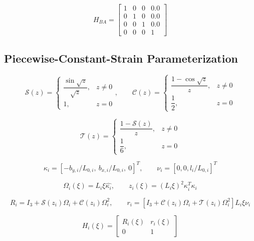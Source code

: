 \documentclass[11pt]{article}
\newcommand{\Sfun}{\mathcal{S}}
\newcommand{\Cfun}{\mathcal{C}}
\newcommand{\Tfun}{\mathcal{T}}
\begin{document}
\begin{equation}
H_{BA}=\begin{bmatrix}1 & 0 & 0 & 0.0\\0 & 1 & 0 & 0.0\\0 & 0 & 1 & 0.0\\0 & 0 & 0 & 1\end{bmatrix}\label{eq:mount-transform}
\end{equation}

\subsection{Piecewise-Constant-Strain Parameterization}
\begin{equation}
\Sfun(z)=\begin{cases}\dfrac{\sin\sqrt z}{\sqrt z},&z\ne0\\1,&z=0\end{cases},\qquad \Cfun(z)=\begin{cases}\dfrac{1-\cos\sqrt z}{z},&z\ne0\\\dfrac12,&z=0\end{cases}
\end{equation}

\begin{equation}
\Tfun(z)=\begin{cases}\dfrac{1-\Sfun(z)}{z},&z\ne0\\\dfrac16,&z=0\end{cases}
\end{equation}

\begin{equation}
\kappa_i=[-b_{y,i}/L_{0,i},\ b_{x,i}/L_{0,i},\ 0]^T,\qquad\nu_i=[0,0,l_i/L_{0,i}]^T
\end{equation}

\begin{equation}
\Omega_i(\xi)=L_i\xi\widehat{\kappa_i},\qquad z_i(\xi)=(L_i\xi)^2\kappa_i^T\kappa_i
\end{equation}

\begin{equation}
R_i=I_3+\Sfun(z_i)\Omega_i+\Cfun(z_i)\Omega_i^2,\qquad r_i=\left[I_3+\Cfun(z_i)\Omega_i+\Tfun(z_i)\Omega_i^2\right]L_i\xi\nu_i
\end{equation}

\begin{equation}
H_i(\xi)=\begin{bmatrix}R_i(\xi)&r_i(\xi)\\0&1\end{bmatrix}\label{eq:local-transform}
\end{equation}
\end{document}
